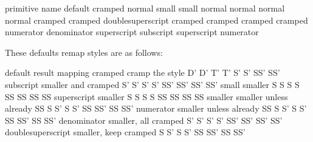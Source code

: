\starttabulate
\FL
\BC primitive name                          \BC default           \NC \NR
\TL
\NC \type {\Umathoverlinevariant}           \NC cramped           \NC \NR
\NC \type {\Umathunderlinevariant}          \NC normal            \NC \NR
\NC \type {\Umathoverdelimitervariant}      \NC small             \NC \NR
\NC \type {\Umathunderdelimitervariant}     \NC small             \NC \NR
\NC \type {\Umathdelimiterovervariant}      \NC normal            \NC \NR
\NC \type {\Umathdelimiterundervariant}     \NC normal            \NC \NR
\NC \type {\Umathhextensiblevariant}        \NC normal            \NC \NR
\NC \type {\Umathvextensiblevariant}        \NC normal            \NC \NR
\NC \type {\Umathfractionvariant}           \NC cramped           \NC \NR
\NC \type {\Umathradicalvariant}            \NC cramped           \NC \NR
\NC \type {\Umathdegreevariant}             \NC doublesuperscript \NC \NR
\NC \type {\Umathaccentvariant}             \NC cramped           \NC \NR
\NC \type {\Umathtopaccentvariant}          \NC cramped           \NC \NR
\NC \type {\Umathbottomaccentvariant}       \NC cramped           \NC \NR
\NC \type {\Umathoverlayaccentvariant}      \NC cramped           \NC \NR
\NC \type {\Umathnumeratorvariant}          \NC numerator         \NC \NR
\NC \type {\Umathdenominatorvariant}        \NC denominator       \NC \NR
\NC \type {\Umathsuperscriptvariant}        \NC superscript       \NC \NR
\NC \type {\Umathsubscriptvariant}          \NC subscript         \NC \NR
\NC \type {\Umathprimevariant}              \NC superscript       \NC \NR
\NC \type {\Umathstackvariant}              \NC numerator         \NC \NR
\LL
\stoptabulate

These defaults remap styles are as follows:

\starttabulate[|Tl|l|l|]
\FL
\BC default           \BC result                    \BC mapping                     \NC \NR
\TB
\NC cramped           \NC cramp the style           \NC D' D' T' T' S'  S'  SS' SS' \NC \NR
\NC subscript         \NC smaller and cramped       \NC S' S' S' S' SS' SS' SS' SS' \NC \NR
\NC small             \NC smaller                   \NC S  S  S  S  SS  SS  SS  SS  \NC \NR
\NC superscript       \NC smaller                   \NC S  S  S  S  SS  SS  SS  SS  \NC \NR
\NC smaller           \NC smaller unless already SS \NC S  S' S  S' SS  SS' SS  SS' \NC \NR
\NC numerator         \NC smaller unless already SS \NC S  S' S  S' SS  SS' SS  SS' \NC \NR
\NC denominator       \NC smaller, all cramped      \NC S' S' S' S' SS' SS' SS' SS' \NC \NR
\NC doublesuperscript \NC smaller, keep cramped     \NC S  S' S  S' SS  SS' SS  SS' \NC \NR
\LL
\stoptabulate

